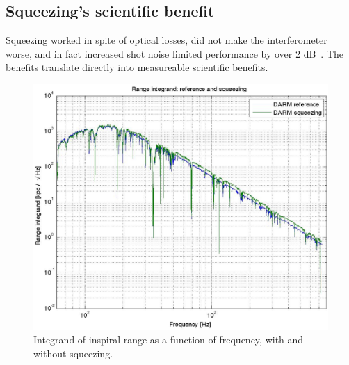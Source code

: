 







\subsection{Squeezing's scientific benefit}

Squeezing worked in spite of optical losses, did not make the interferometer worse, and in fact increased shot noise limited performance by over 2 dB~\cite{BarsottiNatureSqueezing}.
The benefits translate directly into measureable scientific benefits.

\begin{figure}
\begin{center}
\includegraphics[height=0.5\paperheight, width=0.5\paperwidth,keepaspectratio]{range_integrand.eps}
\caption{Integrand of inspiral range as a function of frequency, with and without squeezing.}
\label{squeezing_range_integrand}
\end{center}
\end{figure}

